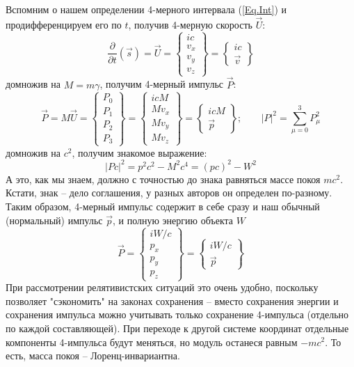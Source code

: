 Вспомним о нашем определении 4-мерного интервала (\ref{Eq.Int}) и продиф\-фе\-рен\-ци\-руем его по $t$, получив 4-мерную скорость $\vec{U}$:
\begin{equation}
\frac{\partial}{\partial t}(\vec{s}) = \vec{U}=\left\{
\begin{array}{c}
ic\\ v_x\\ v_y\\ v_z
\end{array}
\right\}=\left\{
\begin{array}{c}
ic\\ \vec{v}
\end{array}
\right\}
\end{equation}
домножив на $M=m\gamma$, получим 4-мерный импульс $\vec{P}$:
\begin{equation}\label{Eq.4p}
 \vec{P}=M\vec{U}=\left\{\begin{array}{c}
                 P_0\\ P_1\\ P_2\\ P_3
                \end{array}\right\}=
\left\{\begin{array}{c}
                 icM\\ Mv_x\\ Mv_y\\ Mv_z
                \end{array}\right\}
=\left\{
\begin{array}{c}
icM\\ \vec{p}
\end{array}
\right\}
;\;\;\;\;\;\;\;|P|^2 = \sum_{\mu=0}^3P_\mu^2
\end{equation}
домножив на $c^2$, получим знакомое выражение:
\begin{equation}
|Pc|^2=p^2c^2-M^2c^4=(pc)^2-W^2
\end{equation}
А это, как мы знаем, должно с точностью до знака равняться массе покоя $mc^2$.
Кстати, знак -- дело соглашения, у разных авторов он определен по-разному.
Таким образом, 4-мерный импульс содержит в себе сразу и наш обычный (нормальный) импульс $\vec{p}$, и полную энергию объекта $W$
\begin{displaymath}
 \vec{P}=
\left\{\begin{array}{c}
                 iW/c\\ p_x\\ p_y\\ p_z
                \end{array}\right\}
=\left\{
\begin{array}{c}
iW/c\\ \vec{p}
\end{array}
\right\}
\end{displaymath}
При рассмотрении релятивистских ситуаций это очень удобно, поскольку позволяет "сэкономить" на законах сохранения -- вместо сохранения энер\-гии и сохранения импульса можно учитывать только сохранение 4-импуль\-са (отдельно по каждой составляющей). При переходе к другой системе координат отдельные компоненты 4-импульса будут меняться, но модуль останеся равным $-mc^2$. То есть, масса покоя -- Лоренц-инвариантна.

